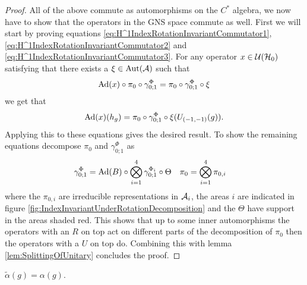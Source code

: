 \documentclass[12pt,a4paper,twoside]{article}
\numberwithin{equation}{section}
\begin{document}
\begin{proof}
	All of the above commute as automorphisms on the $C^*$ algebra, we now have to show that the operators in the GNS space commute as well. First we will start by proving equations \eqref{eq:H^1IndexRotationInvariantCommutator1}, \eqref{eq:H^1IndexRotationInvariantCommutator2} and \eqref{eq:H^1IndexRotationInvariantCommutator3}. For any operator $x\in\UU(\HH_0)$ satisfying that there exists a $\xi\in\Aut{\AA}$ such that
	\begin{equation}
		\Ad{x}\circ\pi_0\circ\gamma^{\Phi}_{0;1}=\pi_0\circ\gamma^{\Phi}_{0;1}\circ\xi
	\end{equation}
	we get that
	\begin{equation}
		\Ad{x}(h_g)=\pi_0\circ\gamma^\Phi_{0;1}\circ\xi(U_{(-1,-1)}(g)).
	\end{equation}
	Applying this to these equations gives the desired result. To show the remaining equations decompose $\pi_0$ and $\gamma^\Phi_{0;1}$ as
	\begin{align}
		\gamma^\Phi_{0;1}&=\Ad{B}\circ\bigotimes_{i=1}^4\gamma^{\Phi_i}_{0;1}\circ\Theta&\pi_0&=\bigotimes_{i=1}^4\pi_{0,i}
	\end{align}
	where the $\pi_{0,i}$ are irreducible representations in $\AA_i$, the areas $i$ are indicated in figure \ref{fig:IndexInvariantUnderRotationDecomposition} and the $\Theta$ have support in the areas shaded red. This shows that up to some inner automorphisms the operators with an $R$ on top act on different parts of the decomposition of $\pi_0$ then the operators with a $U$ on top do. Combining this with lemma \ref{lem:SplittingOfUnitary} concludes the proof.
\end{proof}
\begin{lemma}
	$\tilde{\alpha}(g)=\alpha(g)$.
\end{lemma}
\end{document}
